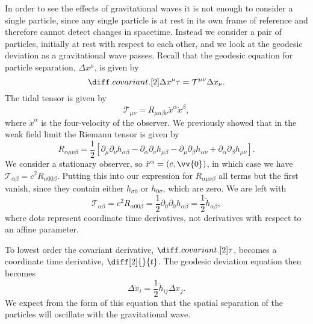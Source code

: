 \documentclass[fleqn]{NotesClass}
\begin{document}
    In order to see the effects of gravitational waves it is not enough to consider a single particle, since any single particle is at rest in its own frame of reference and therefore cannot detect changes in spacetime.
    Instead we consider a pair of particles, initially at rest with respect to each other, and we look at the geodesic deviation as a gravitational wave passes.
    Recall that the geodesic equation for particle separation, \(\Delta x^\mu\), is given by
    \begin{equation}
        \diffcov[2]{\Delta x^\mu}{\tau} = \mathcal{T}^{\mu\nu}\Delta x_\nu.
    \end{equation}
    The tidal tensor is given by
    \begin{equation}
        \mathcal{T}_{\mu\nu} = R_{\mu\alpha\beta\nu}\dot{x}^\alpha\dot{x}^\beta,
    \end{equation}
    where \(\dot{x}^\alpha\) is the four-velocity of the observer.
    We previously showed that in the weak field limit the Riemann tensor is given by
    \begin{equation}
        R_{\alpha\mu\nu\beta} = \frac{1}{2}[\partial_\mu\partial_\nu h_{\alpha\beta} - \partial_\alpha\partial_\nu h_{\mu\beta} - \partial_\mu\partial_\beta h_{\alpha\nu} + \partial_\alpha\partial_\beta h_{\mu\nu}].
    \end{equation}
    We consider a stationary observer, so \(\dot{x}^\alpha = (c, \vv{0})\), in which case we have \(\mathcal{T}_{\alpha\beta} = c^2R_{\alpha00\beta}\).
    Putting this into our expression for \(R_{\alpha\mu\nu\beta}\) all terms but the first vanish, since they contain either \(h_{\sigma0}\) or \(h_{0\sigma}\), which are zero.
    We are left with
    \begin{equation}
        \mathcal{T}_{\alpha\beta} = c^2R_{\alpha00\beta} = \frac{1}{2}\partial_0\partial_0 h_{\alpha\beta} = \frac{1}{2}\ddot{h}_{\alpha\beta},
    \end{equation}
    where dots represent coordinate time derivatives, not derivatives with respect to an affine parameter.
    
    To lowest order the covariant derivative, \(\diffcov[2]{}{\tau}\), becomes a coordinate time derivative, \(\diff[2]{}{t}\).
    The geodesic deviation equation then becomes
    \begin{equation}
        \Delta\ddot{x}_i = \frac{1}{2}\ddot{h}_{ij}\Delta x_j.
    \end{equation}
    We expect from the form of this equation that the spatial separation of the particles will oscillate with the gravitational wave.
    
\end{document}
